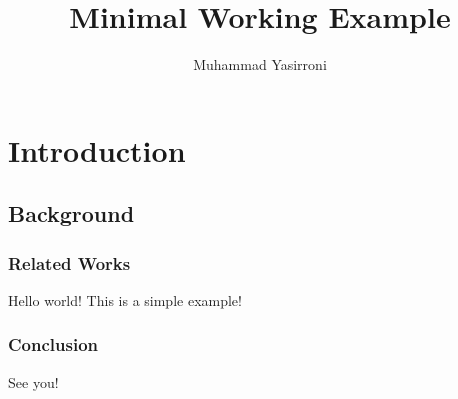 \documentclass{report}
\title{Minimal Working Example}
\author{Muhammad Yasirroni}
\begin{document}
\maketitle

\chapter{Introduction}
\section{Background}
\subsection{Related Works}
Hello world! This is a simple example!

\subsection{Conclusion}
See you!
\end{document}
